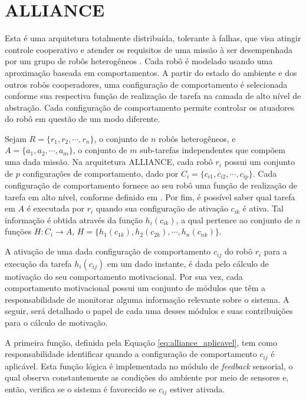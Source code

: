 \chapter{ALLIANCE} \label{app:alliance}
    Esta é uma arquitetura totalmente distribuída, tolerante à falhas, que visa atingir controle cooperativo e atender os requisitos de uma missão à ser desempenhada por um grupo de robôs heterogêneos \cite{ref:parker1998alliance}. Cada robô é modelado usando uma aproximação baseada em comportamentos. A partir do estado do ambiente e dos outros robôs cooperadores, uma configuração de comportamento é selecionada conforme sua respectiva função de realização de tarefa na camada de alto nível de abstração. Cada configuração de comportamento permite controlar os atuadores do robô em questão de um modo diferente.
    
    Sejam $R=\{r_1, r_2, \cdots, r_n\}$, o conjunto de $n$ robôs heterogêneos, e $A=\{a_1,a_2, \cdots,\allowbreak a_m\}$, o conjunto de $m$ sub-tarefas independentes que compõem uma dada missão. Na arquitetura ALLIANCE, cada robô $r_i$ possui um conjunto de $p$ configurações de comportamento, dado por $C_i=\{c_{i1}, c_{i2},\cdots, c_{ip}\}$. Cada configuração de comportamento fornece ao seu robô uma função de realização de tarefa em alto nível, conforme definido em \cite{ref:brooks1986robust}. Por fim, é possível saber qual tarefa em $A$ é executada por $r_i$ quando sua configuração de ativação $c_{ik}$ é ativa. Tal informação é obtida através da função $h_i(c_{ik})$, a qual pertence ao conjunto de $n$ funções $H : C_i \to A$, $H = \{h_1(c_{1k}),\allowbreak h_2(c_{2k}), \cdots, h_n(c_{nk})\}$.
    
    A ativação de uma dada configuração de comportamento $c_{ij}$ do robô $r_i$ para a execução da tarefa $h_i(c_{ij})$ em um dado instante, é dada pelo cálculo de motivação do seu comportamento motivacional. Por sua vez, cada comportamento motivacional possui um conjunto de módulos que têm a responsabilidade de monitorar alguma informação relevante sobre o sistema. A seguir, será detalhado o papel de cada uma desses módulos e suas contribuições para o cálculo de motivação.
    
    A primeira função, definida pela Equação \ref{eq:alliance_aplicavel}, tem como responsabilidade identificar quando a configuração de comportamento $c_{ij}$ é aplicável. Esta função lógica é implementada no módulo de \textit{feedback} sensorial, o qual observa constantemente as condições do ambiente por meio de sensores e, então, verifica se o sistema é favorecido se $c_{ij}$ estiver ativada.
    
